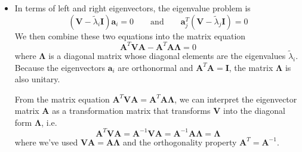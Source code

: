 \documentclass[11pt, a4paper]{article}
\newcommand{\eqtext}[1]{\qquad \text{#1} \qquad}
\newcommand{\mat}[1]{\mathbf{#1}} %
\begin{document}
\begin{itemize}
	\item In terms of left and right eigenvectors, the eigenvalue problem is 
	\begin{equation*}
		(\mat{V} - \tilde{\lambda}_{i}\mat{I}) \bm{a}_{i} = 0 \eqtext{and} \bm{a}_{j}^{T}(\mat{V} - \tilde{\lambda}_{j}\mat{I}) = 0
	\end{equation*}
	We then combine these two equations into the matrix equation
	\begin{equation*}
		\mat{A}^{T} \mat{V} \mat{A} - \mat{A}^{T} \mat{A} \mat{\Lambda} = 0
	\end{equation*}
	where $ \mat{\Lambda} $ is a diagonal matrix whose diagonal elements are the eigenvalues $ \tilde{\lambda}_{i} $. Because the eigenvectors $ \bm{a}_{i} $ are orthonormal and $ \mat{A}^{T} \mat{A} = \mat{I} $, the matrix $ \mat{\Lambda} $ is also unitary.

	From the matrix equation $ \mat{A}^{T} \mat{V} \mat{A} = \mat{A}^{T} \mat{A} \mat{\Lambda}  $, we can interpret the eigenvector matrix $ \mat{A} $ as a transformation matrix that transforms $ \mat{V} $ into the diagonal form $ \mat{\Lambda} $, i.e.
	\begin{equation*}
		\mat{A}^{T} \mat{V} \mat{A} = \mat{A}^{-1} \mat{V} \mat{A} = \mat{A}^{-1} \mat{A} \mat{\Lambda}  = \mat{\Lambda}
	\end{equation*}
	where we've used $ \mat{V} \mat{A} = \mat{A} \mat{\Lambda}  $ and the orthogonality property $ \mat{A}^{T} = \mat{A}^{-1} $.
	
\end{itemize}
\end{document}
